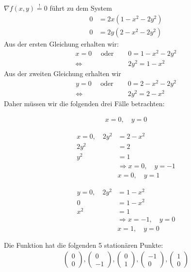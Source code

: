 {$\nabla f(x,y) \overset{!}{=} 0$ führt zu dem System
\begin{align*}
0 &= 2x(1 - x^2 -2y^2)\\
0 &= 2y(2 - x^2 - 2y^2)
\end{align*}
Aus der ersten Gleichung erhalten wir:
\begin{align*}
x = 0 \quad \text{ oder } \quad & 0 = 1 - x^2 - 2y^2 \\
                 \Leftrightarrow & 2y^2 = 1 - x^2  
\end{align*}
Aus der zweiten Gleichung erhalten wir
\begin{align*}
y = 0 \quad \text{ oder } \quad & 0 = 2 - x^2 -2y^2\\
                    \Leftrightarrow & 2y^2 = 2 - x^2
\end{align*}
Daher müssen wir die folgenden drei Fälle betrachten:
\begin{iii}
\item
\begin{align*}
x = 0, \quad y = 0
\end{align*}
\item
\begin{align*}
x = 0, \quad 2y^2 &= 2 - x^2 \\ 
             2y^2 &= 2\\
              y^2 &= 1\\
                  &\Rightarrow x = 0, \quad y = -1\\
                  &            x = 0, \quad y = 1
\end{align*}
\item
\begin{align*}
y=0, \quad 2y^2 &= 1 - x^2\\
            0   &= 1- x^2\\
            x^2 &= 1\\
                &\Rightarrow x = -1, \quad y = 0\\
                &            x = 1, \quad  y = 0
\end{align*}
\end{iii}
Die Funktion hat die folgenden 5 stationären Punkte:
\begin{align*}
\begin{pmatrix} 0 \\ 0 \end{pmatrix},
\begin{pmatrix} 0 \\ -1 \end{pmatrix},
\begin{pmatrix} 0 \\ 1 \end{pmatrix},
\begin{pmatrix} -1 \\ 0 \end{pmatrix},
\begin{pmatrix} 1 \\ 0 \end{pmatrix}
\end{align*}

}
